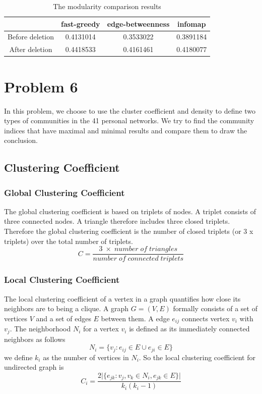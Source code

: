 \documentclass{article}
\begin{document}
\begin {table}[htbp]
\caption{The modularity comparison results}
\begin{adjustbox}{center}
\label{tb:p4}
\begin{tabular}{|c|c|c|c|}
\hline
&fast-greedy &edge-betweenness &infomap\\
\hline
Before deletion&0.4131014&0.3533022&0.3891184\\
\hline
After deletion&0.4418533& 0.4161461& 0.4180077\\
\hline
\end{tabular}
\end{adjustbox}
\end{table}

\section{Problem 6}
In this problem, we choose to use the cluster coefficient and density to define two types of communities in the 41 personal networks. We try to find the community indices that have maximal and minimal results and compare them to draw the conclusion.
\subsection{Clustering Coefficient}
\subsubsection{Global Clustering Coefficient}
The global clustering coefficient is based on triplets of nodes. A triplet consists of three connected nodes. A triangle therefore includes three closed triplets. Therefore the global clustering coefficient is the number of closed triplets (or 3 x triplets) over the total number of triplets.
\begin{equation*}
C = \frac{3\;\times\;number\; of\; triangles}{number\; of\; connected\; triplets}
\end{equation*}
\subsubsection{Local Clustering Coefficient}
The local clustering coefficient of a vertex in a graph quantifies how close its neighbors are to being a clique. A graph $G=(V,E)$ formally consists of a set of vertices $V$ and a set of edges $E$ between them. A edge $e_{ij}$ connects vertex $v_i$ with $v_j$. The neighborhood $N_i$ for a vertex $v_i$ is defined as its immediately connected neighbors as follows
\begin{equation*}
N_i=\lbrace v_j:e_{ij}\in E \cup e_{ji} \in E \rbrace
\end{equation*} 
we define $k_i$ as the number of vertices in $N_i$. So the local clustering coefficient for undirected graph is
\begin{equation*}
C_i = \frac{2 \vert \lbrace e_{jk} : v_j, v_k \in N_i, e_{jk} \in E\rbrace\vert}{k_i(k_i-1)}
\end{equation*}
\end{document}
